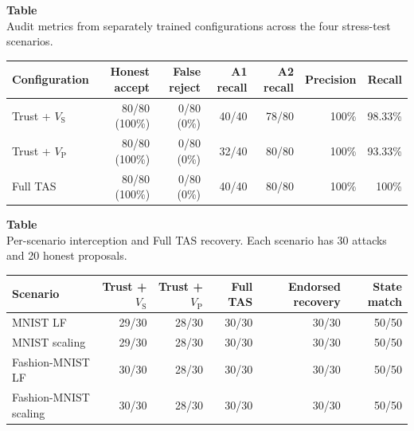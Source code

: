 \noindent\begin{minipage}{\textwidth}
\label{tab:appendix_tas_final}
\textbf{Table~\thetable}\\
Audit metrics from separately trained configurations across the four stress-test scenarios.
\par\smallskip
\centering\small
\setlength{\tabcolsep}{4pt}
\renewcommand{\arraystretch}{1.15}
\begin{tabular}{lrrrrrr}
\toprule
Configuration & Honest accept & False reject & A1 recall & A2 recall & Precision & Recall \\
\midrule
Trust + $V_{\mathrm{S}}$ & 80/80 (100\%) & 0/80 (0\%) & 40/40 & 78/80 & 100\% & 98.33\% \\
Trust + $V_{\mathrm{P}}$ & 80/80 (100\%) & 0/80 (0\%) & 32/40 & 80/80 & 100\% & 93.33\% \\
Full TAS & 80/80 (100\%) & 0/80 (0\%) & 40/40 & 80/80 & 100\% & 100\% \\
\bottomrule
\end{tabular}
\end{minipage}

\noindent\begin{minipage}{\textwidth}
\label{tab:appendix_tas_recovery}
\textbf{Table~\thetable}\\
Per-scenario interception and Full TAS recovery. Each scenario has 30 attacks and 20 honest proposals.
\par\smallskip
\centering\small
\setlength{\tabcolsep}{5pt}
\renewcommand{\arraystretch}{1.15}
\begin{tabular}{lrrrrr}
\toprule
Scenario & Trust + $V_{\mathrm{S}}$ & Trust + $V_{\mathrm{P}}$ & Full TAS & Endorsed recovery & State match \\
\midrule
MNIST LF & 29/30 & 28/30 & 30/30 & 30/30 & 50/50 \\
MNIST scaling & 29/30 & 28/30 & 30/30 & 30/30 & 50/50 \\
Fashion-MNIST LF & 30/30 & 28/30 & 30/30 & 30/30 & 50/50 \\
Fashion-MNIST scaling & 30/30 & 28/30 & 30/30 & 30/30 & 50/50 \\
\bottomrule
\end{tabular}
\end{minipage}

